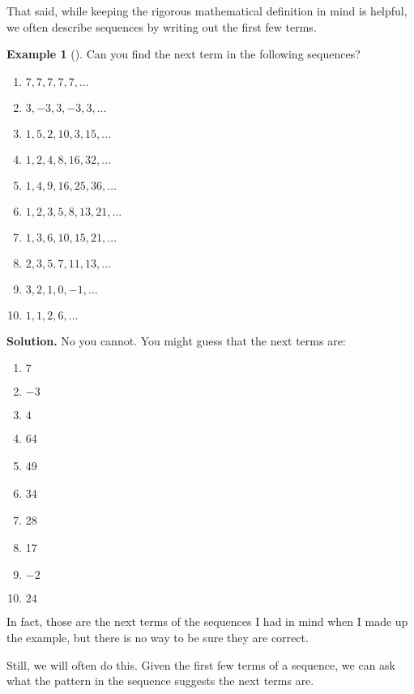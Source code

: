 \documentclass[10pt,]{book}
\theoremstyle{plain}
\theoremstyle{definition}
\theoremstyle{definition}
\newtheorem{example}[theorem]{Example}
\theoremstyle{definition}
\theoremstyle{definition}
\numberwithin{equation}{chapter}
\begin{document}
\par
\hypertarget{p-30}{}%
That said, while keeping the rigorous mathematical definition in mind is helpful, we often describe sequences by writing out the first few terms.%
\begin{example}[]\label{example-1}
\hypertarget{p-31}{}%
Can you find the next term in the following sequences?%
\par
\hypertarget{p-32}{}%
\leavevmode%
\begin{enumerate}
\item\hypertarget{li-8}{}\(7,7,7,7,7, \ldots\)%
\item\hypertarget{li-9}{}\(3, -3, 3, -3, 3, \ldots\)%
\item\hypertarget{li-10}{}\(1, 5, 2, 10, 3, 15, \ldots\)%
\item\hypertarget{li-11}{}\(1, 2, 4, 8, 16, 32, \ldots\)%
\item\hypertarget{li-12}{}\(1, 4, 9, 16, 25, 36, \ldots\)%
\item\hypertarget{li-13}{}\(1, 2, 3, 5, 8, 13, 21, \ldots\)%
\item\hypertarget{li-14}{}\(1, 3, 6, 10, 15, 21, \ldots\)%
\item\hypertarget{li-15}{}\(2, 3, 5, 7, 11, 13, \ldots\)%
\item\hypertarget{li-16}{}\(3, 2, 1, 0, -1, \ldots\)%
\item\hypertarget{li-17}{}\(1, 1, 2, 6, \ldots\)%
\end{enumerate}
%
\par\smallskip%
\noindent\textbf{Solution.}\hypertarget{solution-1}{}\quad%
\hypertarget{p-33}{}%
No you cannot. You might guess that the next terms are:%
\par
\hypertarget{p-34}{}%
\leavevmode%
\begin{enumerate}
\item\hypertarget{li-18}{}\(7\)%
\item\hypertarget{li-19}{}\(-3\)%
\item\hypertarget{li-20}{}\(4\)%
\item\hypertarget{li-21}{}\hypertarget{p-35}{}%
64%
\item\hypertarget{li-22}{}\hypertarget{p-36}{}%
49%
\item\hypertarget{li-23}{}\hypertarget{p-37}{}%
34%
\item\hypertarget{li-24}{}\hypertarget{p-38}{}%
28%
\item\hypertarget{li-25}{}\hypertarget{p-39}{}%
17%
\item\hypertarget{li-26}{}\(-2\)%
\item\hypertarget{li-27}{}\(24\)%
\end{enumerate}
%
\par
\hypertarget{p-40}{}%
In fact, those are the next terms of the sequences I had in mind when I made up the example, but there is no way to be sure they are correct.%
\par
\hypertarget{p-41}{}%
Still, we will often do this. Given the first few terms of a sequence, we can ask what the pattern in the sequence suggests the next terms are.%
\end{example}
\end{document}
